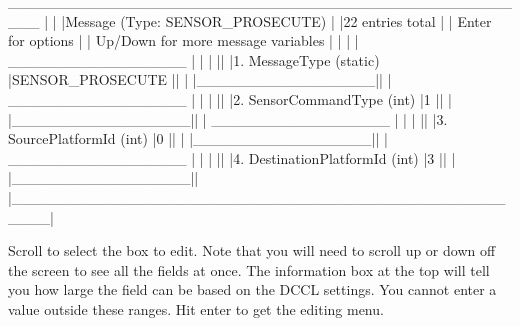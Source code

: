 \documentclass[11pt, letterpaper, oneside]{memoir}
\begin{document}
\begin{itemize}
\begin{boxedverbatim}
   ___________________________________________________
  |                                                   | 
  |Message (Type: SENSOR_PROSECUTE)                   |
  |22 entries total                                   |
  |        {Enter} for options                        |
  |        {Up/Down} for more message variables       |
  |                                                   |
  |                                 _________________ |
  |                                |                 ||
  |1. MessageType (static)         |SENSOR_PROSECUTE ||
  |                                |_________________||
  |                                 _________________ |
  |                                |                 ||
  |2. SensorCommandType (int)      |1                ||
  |                                |_________________||
  |                                 _________________ |
  |                                |                 || 
  |3. SourcePlatformId (int)       |0                ||
  |                                |_________________||
  |                                 _________________ |
  |                                |                 ||
  |4. DestinationPlatformId (int)  |3                ||
  |                                |_________________||
  |___________________________________________________|
\end{boxedverbatim}
\resetbvlinenumber

Scroll to select the box to edit. Note that you will need to scroll up or down off the screen to see all the fields at once. The information box at the top will tell you how large the field can be based on the DCCL settings. You cannot enter a value outside these ranges. Hit enter to get the editing menu.


\end{itemize}
\end{document}
